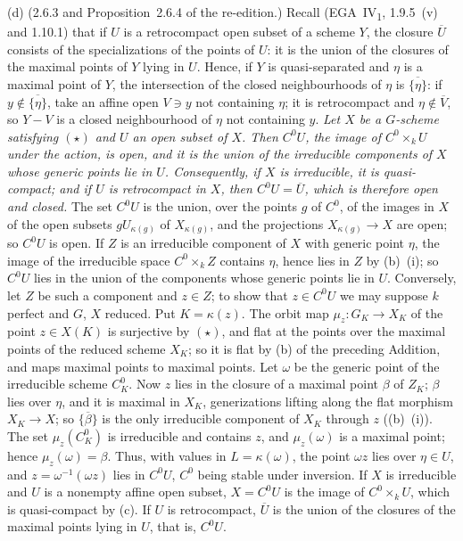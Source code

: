 (d) (2.6.3 and Proposition~2.6.4 of the re-edition.) Recall (EGA~IV\textsubscript{1}, 1.9.5~(v) and
1.10.1) that if \(U\) is a retrocompact open subset of a scheme \(Y\), the closure \(\overline U\)
consists of the specializations of the points of \(U\): it is the union of the closures of the
maximal points of \(Y\) lying in \(U\). Hence, if \(Y\) is quasi-separated and \(\eta\) is a maximal
point of \(Y\), the intersection of the closed neighbourhoods of \(\eta\) is
\(\overline{\{\eta\}}\): if \(y\notin\overline{\{\eta\}}\), take an affine open \(V\ni y\) not
containing \(\eta\); it is retrocompact and \(\eta\notin\overline V\), so \(Y-V\) is a closed
neighbourhood of \(\eta\) not containing \(y\).
\label{prop:sga3-VIA-2.6.4}%
\emph{Let \(X\) be a \(G\)-scheme satisfying \((\star)\) and \(U\) an open subset of \(X\). Then
\(C^0U\), the image of \(C^0\times_kU\) under the action, is open, and it is the union of the
irreducible components of \(X\) whose generic points lie in \(U\). Consequently, if \(X\) is
irreducible, it is quasi-compact; and if \(U\) is retrocompact in \(X\), then \(C^0U=\overline U\),
which is therefore open and closed.} The set \(C^0U\) is the union, over the points \(g\) of \(C^0\),
of the images in \(X\) of the open subsets \(gU_{\kappa(g)}\) of \(X_{\kappa(g)}\), and the
projections \(X_{\kappa(g)}\to X\) are open; so \(C^0U\) is open. If \(Z\) is an irreducible
component of \(X\) with generic point \(\eta\), the image of the irreducible space \(C^0\times_kZ\)
contains \(\eta\), hence lies in \(Z\) by (b)~(i); so \(C^0U\) lies in the union of the components
whose generic points lie in \(U\). Conversely, let \(Z\) be such a component and \(z\in Z\); to show
that \(z\in C^0U\) we may suppose \(k\) perfect and \(G\), \(X\) reduced. Put \(K=\kappa(z)\). The
orbit map \(\mu_z\colon G_K\to X_K\) of the point \(z\in X(K)\) is surjective by \((\star)\), and flat
at the points over the maximal points of the reduced scheme \(X_K\); so it is flat by (b) of the
preceding Addition, and maps maximal points to maximal points. Let \(\omega\) be the generic point of
the irreducible scheme \(C^0_K\). Now \(z\) lies in the closure of a maximal point \(\beta\) of
\(Z_K\); \(\beta\) lies over \(\eta\), and it is maximal in \(X_K\), generizations lifting along the
flat morphism \(X_K\to X\); so \(\overline{\{\beta\}}\) is the only irreducible component of \(X_K\)
through \(z\) ((b)~(i)). The set \(\mu_z(C^0_K)\) is irreducible and contains \(z\), and
\(\mu_z(\omega)\) is a maximal point; hence \(\mu_z(\omega)=\beta\). Thus, with values in
\(L=\kappa(\omega)\), the point \(\omega z\) lies over \(\eta\in U\), and \(z=\omega^{-1}(\omega z)\)
lies in \(C^0U\), \(C^0\) being stable under inversion. If \(X\) is irreducible and \(U\) is a
nonempty affine open subset, \(X=C^0U\) is the image of \(C^0\times_kU\), which is quasi-compact by
(c). If \(U\) is retrocompact, \(\overline U\) is the union of the closures of the maximal points lying
in \(U\), that is, \(C^0U\).

